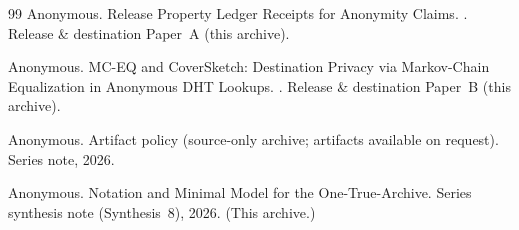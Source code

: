 \documentclass[11pt]{article}
\begin{document}
\begin{thebibliography}{99}
Anonymous.
\newblock Release Property Ledger Receipts for Anonymity Claims.
.
\newblock Release \& destination Paper~A (this archive).

Anonymous.
\newblock MC-EQ and CoverSketch: Destination Privacy via Markov-Chain Equalization in Anonymous DHT Lookups.
.
\newblock Release \& destination Paper~B (this archive).

Anonymous.
\newblock Artifact policy (source-only archive; artifacts available on request).
\newblock Series note, 2026.

Anonymous.
\newblock Notation and Minimal Model for the One-True-Archive.
\newblock Series synthesis note (Synthesis~8), 2026. (This archive.)

\end{thebibliography}
\end{document}
